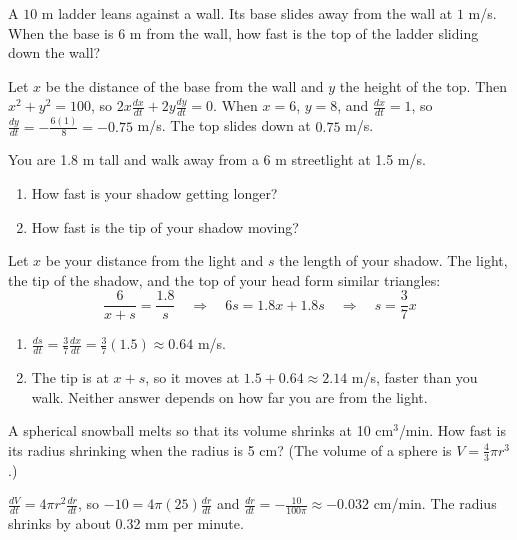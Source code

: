 \begin{Exercise}[title={A Sliding Ladder}, label=rr_ladder]
A $10$ m ladder leans against a wall. Its base slides away from the wall at $1$ m/s. When the base is $6$ m from the wall, how fast is the top of the ladder sliding down the wall?
\end{Exercise}
\begin{Answer}[ref=rr_ladder]
Let $x$ be the distance of the base from the wall and $y$ the height of the top. Then $x^2 + y^2 = 100$, so $2x\frac{dx}{dt} + 2y\frac{dy}{dt} = 0$. When $x = 6$, $y = 8$, and $\frac{dx}{dt} = 1$, so $\frac{dy}{dt} = -\frac{6(1)}{8} = -0.75$ m/s. The top slides down at $0.75$ m/s.
\end{Answer}

\begin{Exercise}[title={Your Shadow}, label=rr_shadow]
You are 1.8 m tall and walk away from a 6 m streetlight at 1.5 m/s.
\begin{enumerate}
\item How fast is your shadow getting longer?
\item How fast is the tip of your shadow moving?
\end{enumerate}
\end{Exercise}
\begin{Answer}[ref=rr_shadow]
Let $x$ be your distance from the light and $s$ the length of your
shadow. The light, the tip of the shadow, and the top of your head form
similar triangles:
$$\frac{6}{x + s} = \frac{1.8}{s} \quad\Rightarrow\quad 6s = 1.8x + 1.8s \quad\Rightarrow\quad s = \frac{3}{7}x$$
\begin{enumerate}
\item $\frac{ds}{dt} = \frac{3}{7}\frac{dx}{dt} = \frac{3}{7}(1.5) \approx 0.64$ m/s.
\item The tip is at $x + s$, so it moves at $1.5 + 0.64 \approx 2.14$ m/s,
faster than you walk. Neither answer depends on how far you are from the
light.
\end{enumerate}
\end{Answer}

\begin{Exercise}[title={The Snowball}, label=rr_snowball]
A spherical snowball melts so that its volume shrinks at 10 cm$^3$/min. How
fast is its radius shrinking when the radius is 5 cm? (The volume of a
sphere is $V = \frac{4}{3}\pi r^3$.)
\end{Exercise}
\begin{Answer}[ref=rr_snowball]
$\frac{dV}{dt} = 4\pi r^2 \frac{dr}{dt}$, so $-10 = 4\pi(25)\frac{dr}{dt}$
and $\frac{dr}{dt} = -\frac{10}{100\pi} \approx -0.032$ cm/min. The
radius shrinks by about 0.32 mm per minute.
\end{Answer}

